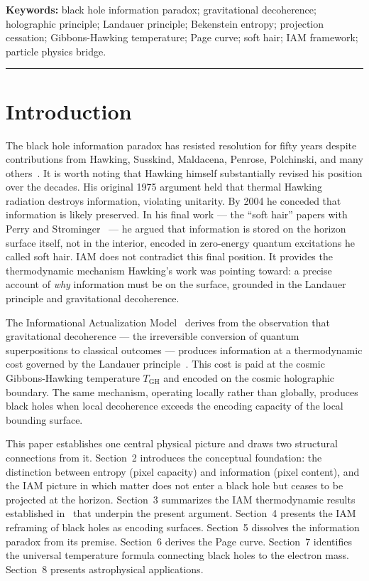 \documentclass[12pt,letterpaper]{article}
\begin{document}
\noindent\textbf{Keywords:} black hole information paradox; gravitational decoherence;
holographic principle; Landauer principle; Bekenstein entropy; projection cessation;
Gibbons-Hawking temperature; Page curve; soft hair; IAM framework; particle physics bridge.

\rule{\linewidth}{0.4pt}

\section{Introduction}

The black hole information paradox has resisted resolution for
fifty years despite contributions from Hawking, Susskind, Maldacena,
Penrose, Polchinski, and many others~\cite{Hawking1975,Page1993,Maldacena1997,AMPS2012,MaldacenaSusskind2013,Penrose2004}.
It is worth noting that Hawking himself substantially revised his
position over the decades. His original 1975 argument held that
thermal Hawking radiation destroys information, violating unitarity.
By 2004 he conceded that information is likely preserved.
In his final work --- the ``soft hair'' papers with Perry and
Strominger~\cite{HawkingPerry2016} --- he argued that information
is stored on the horizon surface itself, not in the interior, encoded
in zero-energy quantum excitations he called soft hair.
IAM does not contradict this final position.
It provides the thermodynamic mechanism Hawking's work was pointing toward:
a precise account of \emph{why} information must be on the surface,
grounded in the Landauer principle and gravitational decoherence.

The Informational Actualization Model~\cite{Mahaffey2026theory} derives
from the observation that gravitational decoherence --- the irreversible
conversion of quantum superpositions to classical outcomes --- produces
information at a thermodynamic cost governed by the Landauer
principle~\cite{Landauer1961}.
This cost is paid at the cosmic Gibbons-Hawking temperature $T_\text{GH}$
and encoded on the cosmic holographic boundary.
The same mechanism, operating locally rather than globally,
produces black holes when local decoherence exceeds the encoding
capacity of the local bounding surface.

This paper establishes one central physical picture and draws two structural
connections from it.
Section~2 introduces the conceptual foundation: the distinction between
entropy (pixel capacity) and information (pixel content), and the
IAM picture in which matter does not enter a black hole but ceases
to be projected at the horizon.
Section~3 summarizes the IAM thermodynamic results established
in~\cite{MahaffeyBHThermo2026} that underpin the present argument.
Section~4 presents the IAM reframing of black holes as encoding surfaces.
Section~5 dissolves the information paradox from its premise.
Section~6 derives the Page curve.
Section~7 identifies the universal temperature formula connecting
black holes to the electron mass.
Section~8 presents astrophysical applications.
\end{document}
